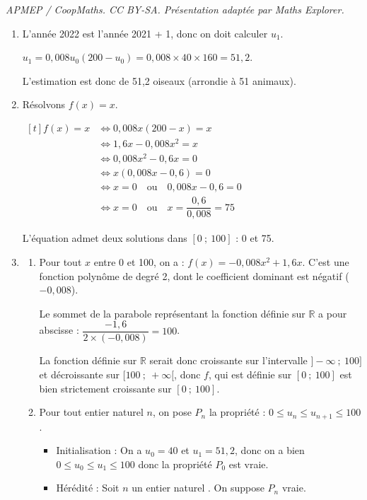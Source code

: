 \documentclass[10pt]{article}
\providecommand{\R}{\mathbb{R}}
\begin{document}
\noindent\textit{APMEP / CoopMaths. CC BY-SA. Présentation adaptée par Maths Explorer.}\par\medskip
\medskip

\begin{enumerate}
\item L'année 2022 est l'année 2021 + 1, donc on doit calculer $u_1$.

$u_1 = 0,008u_0(200 - u_0) = 0,008\times 40 \times 160 = 51,2$.

L'estimation est donc de 51,2 oiseaux (arrondie à 51 animaux).

\item Résolvons $f(x) = x$.

$ \begin{aligned}[t] f(x) = x &\iff 0,008x(200 - x) = x \\
&\iff 1,6x - 0,008x^2 = x\\
&\iff 0,008x^2 - 0,6x = 0\\
&\iff x(0,008x - 0,6) = 0\\
&\iff x = 0 \quad \text{ou}\quad 0,008x - 0,6 = 0\\
&\iff x = 0 \quad \text{ou}\quad x = \dfrac{0,6}{0,008} =75
\end{aligned}$

L'équation admet deux solutions dans $ [0~;~100] $ : 0 et 75.

\item 
	\begin{enumerate}
		\item Pour tout $x$ entre 0 et 100, on a : $f(x) = -0,008x^2 + 1,6x$. C'est une fonction polynôme de degré 2, dont le coefficient dominant est négatif ($-0,008$).

Le sommet de la parabole représentant la fonction définie sur $\R$ a pour abscisse : $\dfrac{- 1,6}{2\times (- 0,008)} = 100$.

La fonction définie sur $\R$ serait donc croissante sur l'intervalle $]-\infty~;~100]$ et décroissante sur $[100~;~+\infty[$, donc $f$, qui est définie sur $[0~;~100]$ est bien strictement croissante sur $ [0~;~100] $.

		\item Pour tout entier naturel $n$, on pose $P_n$ la propriété : \og $0\leqslant u_n \leqslant u_{n+1} \leqslant 100$\fg{}.

\begin{itemize}
\item Initialisation : On a $u_0 = 40$ et $u_1 = 51,2$, donc on a bien $0 \leqslant u_0 \leqslant u_1 \leqslant 100$ donc la propriété $P_0$ est vraie.
\item Hérédité : Soit $n$ un entier naturel . On suppose $P_n$ vraie.


\end{itemize}
\end{enumerate}
\end{enumerate}
\end{document}
